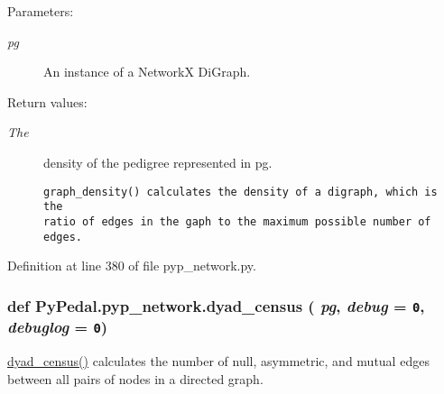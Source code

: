 \begin{Desc}
\item[Parameters:]
\begin{description}
\item[{\em pg}]An instance of a Network\-X Di\-Graph. \end{description}
\end{Desc}
\begin{Desc}
\item[Return values:]
\begin{description}
\item[{\em The}]density of the pedigree represented in pg.

\footnotesize\begin{verbatim}graph_density() calculates the density of a digraph, which is the
ratio of edges in the gaph to the maximum possible number of edges.
\end{verbatim}
\normalsize
 \end{description}
\end{Desc}


Definition at line 380 of file pyp\_\-network.py.\hypertarget{namespacePyPedal_1_1pyp__network_2d0c4f1e9cb1ea3163aef28c9b3a7ac0}{
\subsubsection[dyad\_\-census]{\setlength{\rightskip}{0pt plus 5cm}def Py\-Pedal.pyp\_\-network.dyad\_\-census ( {\em pg},  {\em debug} = {\tt 0},  {\em debuglog} = {\tt 0})}}
\label{namespacePyPedal_1_1pyp__network_2d0c4f1e9cb1ea3163aef28c9b3a7ac0}


\hyperlink{namespacePyPedal_1_1pyp__network_2d0c4f1e9cb1ea3163aef28c9b3a7ac0}{dyad\_\-census()} calculates the number of null, asymmetric, and mutual edges between all pairs of nodes in a directed graph. 

